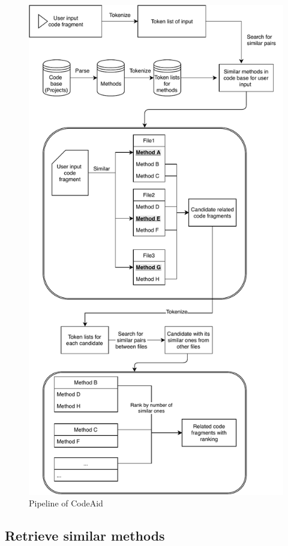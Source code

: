 \begin{figure}
	\includegraphics[width=\linewidth]{figures/pipeline.pdf}
	\caption{Pipeline of CodeAid}
	\label{fig:pipeline}
\end{figure}

\subsection{Retrieve similar methods}
